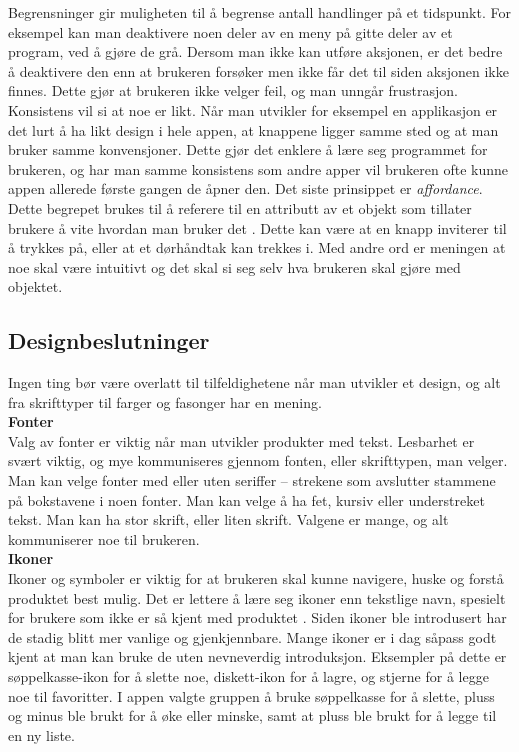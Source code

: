 Begrensninger gir muligheten til å begrense antall handlinger på et tidspunkt. For eksempel kan man deaktivere noen deler av en meny på gitte deler av et program, ved å gjøre de grå. Dersom man ikke kan utføre aksjonen, er det bedre å deaktivere den enn at brukeren forsøker men ikke får det til siden aksjonen ikke finnes. Dette gjør at brukeren ikke velger feil, og man unngår frustrasjon.
Konsistens vil si at noe er likt. Når man utvikler for eksempel en applikasjon er det lurt å ha likt design i hele appen, at knappene ligger samme sted og at man bruker samme konvensjoner. Dette gjør det enklere å lære seg programmet for brukeren, og har man samme konsistens som andre apper vil brukeren ofte kunne appen allerede første gangen de åpner den. 
Det siste prinsippet er \textit{affordance}. Dette begrepet brukes til å referere til en attributt av et objekt som tillater brukere å vite hvordan man bruker det \cite[p.~29]{preece}. Dette kan være at en knapp inviterer til å trykkes på, eller at et dørhåndtak kan trekkes i. Med andre ord er meningen at noe skal være intuitivt og det skal si seg selv hva brukeren skal gjøre med objektet.


\subsection{Designbeslutninger}
Ingen ting bør være overlatt til tilfeldighetene når man utvikler et design, og alt fra skrifttyper til farger og fasonger har en mening.\\ %

\noindent\textbf{Fonter}\\
Valg av fonter er viktig når man utvikler produkter med tekst. Lesbarhet er svært viktig, og mye kommuniseres gjennom fonten, eller skrifttypen, man velger. Man kan velge fonter med eller uten seriffer – strekene som avslutter stammene på bokstavene i noen fonter. Man kan velge å ha fet, kursiv eller understreket tekst. Man kan ha stor skrift, eller liten skrift. Valgene er mange, og alt kommuniserer noe til brukeren.\\

\noindent\textbf{Ikoner}\\
Ikoner og symboler er viktig for at brukeren skal kunne navigere, huske og forstå produktet best mulig. Det er lettere å lære seg ikoner enn tekstlige navn, spesielt for brukere som ikke er så kjent med produktet \cite[p.~171]{preece}. Siden ikoner ble introdusert har de stadig blitt mer vanlige og gjenkjennbare. Mange ikoner er i dag såpass godt kjent at man kan bruke de uten nevneverdig introduksjon. Eksempler på dette er søppelkasse-ikon for å slette noe, diskett-ikon for å lagre, og stjerne for å legge noe til favoritter. I appen valgte gruppen å bruke søppelkasse for å slette, pluss og minus ble brukt for å øke eller minske, samt at pluss ble brukt for å legge til en ny liste.\\

